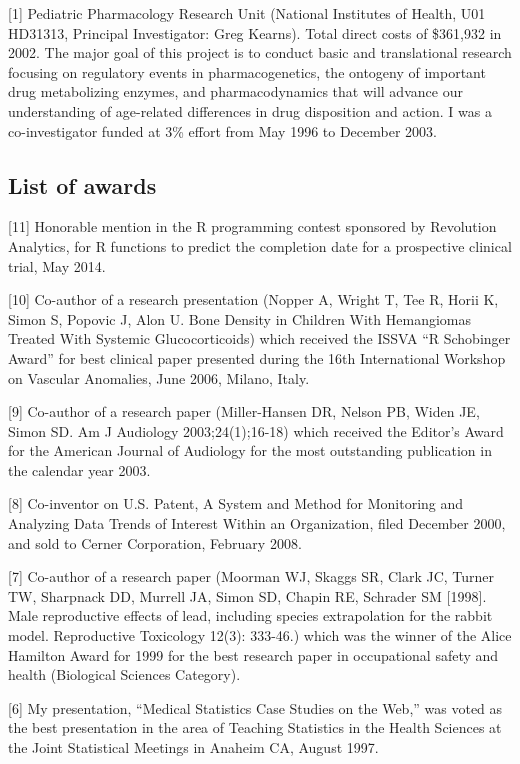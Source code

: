 \documentclass[
  12pt,
]{article}
\begin{document}
{[}1{]} Pediatric Pharmacology Research Unit (National Institutes of
Health, U01 HD31313, Principal Investigator: Greg Kearns). Total direct
costs of \$361,932 in 2002. The major goal of this project is to conduct
basic and translational research focusing on regulatory events in
pharmacogenetics, the ontogeny of important drug metabolizing enzymes,
and pharmacodynamics that will advance our understanding of age-related
differences in drug disposition and action. I was a co-investigator
funded at 3\% effort from May 1996 to December 2003.

\subsection{List of awards}\label{list-of-awards}

{[}11{]} Honorable mention in the R programming contest sponsored by
Revolution Analytics, for R functions to predict the completion date for
a prospective clinical trial, May 2014.

{[}10{]} Co-author of a research presentation (Nopper A, Wright T, Tee
R, Horii K, Simon S, Popovic J, Alon U. Bone Density in Children With
Hemangiomas Treated With Systemic Glucocorticoids) which received the
ISSVA ``R Schobinger Award'' for best clinical paper presented during
the 16th International Workshop on Vascular Anomalies, June 2006,
Milano, Italy.

{[}9{]} Co-author of a research paper (Miller-Hansen DR, Nelson PB,
Widen JE, Simon SD. Am J Audiology 2003;24(1);16-18) which received the
Editor's Award for the American Journal of Audiology for the most
outstanding publication in the calendar year 2003.

{[}8{]} Co-inventor on U.S. Patent, A System and Method for Monitoring
and Analyzing Data Trends of Interest Within an Organization, filed
December 2000, and sold to Cerner Corporation, February 2008.

{[}7{]} Co-author of a research paper (Moorman WJ, Skaggs SR, Clark JC,
Turner TW, Sharpnack DD, Murrell JA, Simon SD, Chapin RE, Schrader SM
{[}1998{]}. Male reproductive effects of lead, including species
extrapolation for the rabbit model. Reproductive Toxicology 12(3):
333-46.) which was the winner of the Alice Hamilton Award for 1999 for
the best research paper in occupational safety and health (Biological
Sciences Category).

{[}6{]} My presentation, ``Medical Statistics Case Studies on the Web,''
was voted as the best presentation in the area of Teaching Statistics in
the Health Sciences at the Joint Statistical Meetings in Anaheim CA,
August 1997.
\end{document}
